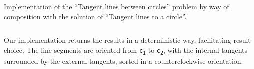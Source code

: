 \begin{listing}[htbp]
  \caption[Tangent lines between circles]{
    Implementation of the ``Tangent lines between circles'' problem by way of
    composition with the solution of ``Tangent lines to a circle''.}%
  \label{lst:solution.impl.gcps.tanglines2circle}
  \inputminted[firstline=18,lastline=59]{julia}{jl/circ_tangent_lines.jl}
\end{listing}

Our implementation returns the results in a deterministic way, facilitating
result choice.  The line segments are oriented from \texttt{c\textsubscript{1}}
to \texttt{c\textsubscript{2}}, with the internal tangents surrounded by the
external tangents, sorted in a counterclockwise orientation.
